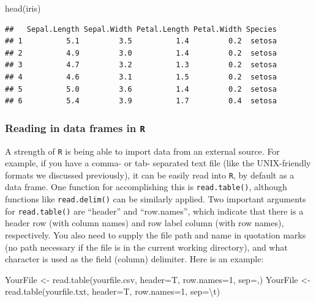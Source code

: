 \documentclass[
]{book}
\newenvironment{Shaded}{\begin{snugshade}}{\end{snugshade}}
\newcommand{\AttributeTok}[1]{\textcolor[rgb]{0.77,0.63,0.00}{#1}}
\newcommand{\DecValTok}[1]{\textcolor[rgb]{0.00,0.00,0.81}{#1}}
\newcommand{\FunctionTok}[1]{\textcolor[rgb]{0.00,0.00,0.00}{#1}}
\newcommand{\NormalTok}[1]{#1}
\newcommand{\OtherTok}[1]{\textcolor[rgb]{0.56,0.35,0.01}{#1}}
\newcommand{\SpecialCharTok}[1]{\textcolor[rgb]{0.00,0.00,0.00}{#1}}
\newcommand{\StringTok}[1]{\textcolor[rgb]{0.31,0.60,0.02}{#1}}
\begin{document}
\begin{Shaded}
\begin{Highlighting}[]
\FunctionTok{head}\NormalTok{(iris)}
\end{Highlighting}
\end{Shaded}

\begin{verbatim}
##   Sepal.Length Sepal.Width Petal.Length Petal.Width Species
## 1          5.1         3.5          1.4         0.2  setosa
## 2          4.9         3.0          1.4         0.2  setosa
## 3          4.7         3.2          1.3         0.2  setosa
## 4          4.6         3.1          1.5         0.2  setosa
## 5          5.0         3.6          1.4         0.2  setosa
## 6          5.4         3.9          1.7         0.4  setosa
\end{verbatim}

\hypertarget{reading-in-data-frames-in-r}{%
\subsubsection{\texorpdfstring{Reading in data frames in \texttt{R}}{Reading in data frames in R}}\label{reading-in-data-frames-in-r}}

A strength of \texttt{R} is being able to import data from an external source. For example, if you have a comma- or tab- separated text file (like the UNIX-friendly formats we discussed previously), it can be easily read into \texttt{R}, by default as a data frame. One function for accomplishing this is \texttt{read.table()}, although functions like \texttt{read.delim()} can be similarly applied. Two important arguments for \texttt{read.table()} are ``header'' and ``row.names'', which indicate that there is a header row (with column names) and row label column (with row names), respectively. You also need to supply the file path and name in quotation marks (no path necessary if the file is in the current working directory), and what character is used as the field (column) delimiter. Here is an example:

\begin{Shaded}
\begin{Highlighting}[]
\NormalTok{YourFile }\OtherTok{\textless{}{-}} \FunctionTok{read.table}\NormalTok{(}\StringTok{\textquotesingle{}yourfile.csv\textquotesingle{}}\NormalTok{, }\AttributeTok{header=}\NormalTok{T, }\AttributeTok{row.names=}\DecValTok{1}\NormalTok{, }\AttributeTok{sep=}\StringTok{\textquotesingle{},\textquotesingle{}}\NormalTok{)}
\NormalTok{YourFile }\OtherTok{\textless{}{-}} \FunctionTok{read.table}\NormalTok{(}\StringTok{\textquotesingle{}yourfile.txt\textquotesingle{}}\NormalTok{, }\AttributeTok{header=}\NormalTok{T, }\AttributeTok{row.names=}\DecValTok{1}\NormalTok{, }\AttributeTok{sep=}\StringTok{\textquotesingle{}}\SpecialCharTok{\textbackslash{}t}\StringTok{\textquotesingle{}}\NormalTok{)}
\end{Highlighting}
\end{Shaded}
\end{document}
